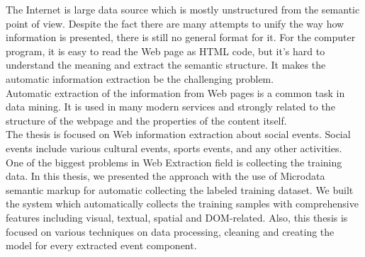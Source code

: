 \abstractpage

The Internet is large data source which is mostly unstructured from the semantic point of view. Despite the fact there are many attempts to unify the way how information is presented, there is still no general format for it. For the computer program, it is easy to read the Web page as HTML code, but it's hard to understand the meaning and extract the semantic structure. It makes the automatic information extraction be the challenging problem. \\

Automatic extraction of the information from Web pages is a common task in data mining. It is used in many modern services and strongly related to the structure of the webpage and the properties of the content itself.\\

The thesis is focused on Web information extraction about social events. Social events include various cultural events, sports events, and any other activities. \\

One of the biggest problems in Web Extraction field is collecting the training data. In this thesis, we presented the approach with the use of Microdata semantic markup for automatic collecting the labeled training dataset. We built the system which automatically collects the training samples with comprehensive features including visual, textual, spatial and DOM-related. Also, this thesis is focused on various techniques on data processing, cleaning and creating the model for every extracted event component.  